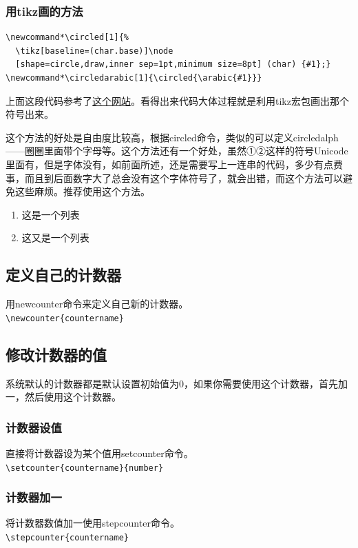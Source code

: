 \documentclass[12pt,oneside]{book}
\begin{document}
\begin{common-format}
\subsubsection{用tikz画的方法}
\begin{Verbatim}
\newcommand*\circled[1]{%
  \tikz[baseline=(char.base)]\node
  [shape=circle,draw,inner sep=1pt,minimum size=8pt] (char) {#1};}
\newcommand*\circledarabic[1]{\circled{\arabic{#1}}}
\end{Verbatim}

上面这段代码参考了\href{http://tex.stackexchange.com/questions/133264/circled-footnote-symbols-with-pifont-showing-arrows-instead-of-circled-numbers}{这个网站}。看得出来代码大体过程就是利用tikz宏包画出那个符号出来。

这个方法的好处是自由度比较高，根据circled命令，类似的可以定义circledalph——圈圈里面带个字母等。这个方法还有一个好处，虽然①②这样的符号Unicode里面有，但是字体没有，如前面所述，还是需要写上一连串的代码，多少有点费事，而且到后面数字大了总会没有这个字体符号了，就会出错，而这个方法可以避免这些麻烦。推荐使用这个方法。

\begin{enumerate}
\renewcommand{\labelenumi}{\circledarabic{enumi}}
\item 这是一个列表
\item 这又是一个列表
\end{enumerate}

\subsection{定义自己的计数器}
用newcounter命令来定义自己新的计数器。\\
\verb+\newcounter{countername}+

\subsection{修改计数器的值}
系统默认的计数器都是默认设置初始值为0，如果你需要使用这个计数器，首先加一，然后使用这个计数器。
\subsubsection{计数器设值}
直接将计数器设为某个值用setcounter命令。\\
\verb+\setcounter{countername}{number}+
\subsubsection{计数器加一}
将计数器数值加一使用stepcounter命令。\\
\verb+\stepcounter{countername}+


\end{common-format}
\end{document}
